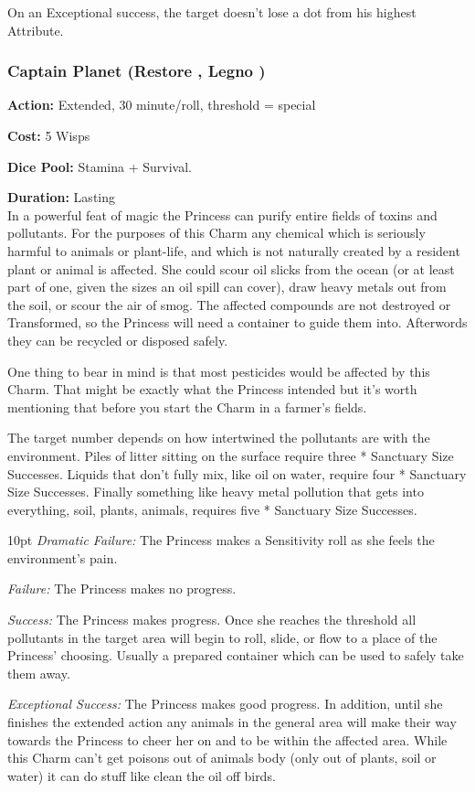On an Exceptional success, the target doesn't lose a dot from his highest Attribute.

\subsubsection*{Captain Planet (Restore \textbullet\textbullet\textbullet\textbullet\textbullet, Legno \textbullet\textbullet\textbullet)}

\noindent \textbf{Action:} Extended, 30 minute/roll, threshold = special

\noindent \textbf{Cost:} 5 Wisps

\noindent \textbf{Dice Pool:} Stamina + Survival.

\noindent \textbf{Duration:} Lasting \\

\noindent In a powerful feat of magic the Princess can purify entire fields of toxins and pollutants. For the purposes of this Charm any chemical which is seriously harmful to animals or plant-life, and which is not naturally created by a resident plant or animal is affected. She could scour oil slicks from the ocean (or at least part of one, given the sizes an oil spill can cover), draw heavy metals out from the soil, or scour the air of smog. The affected compounds are not destroyed or Transformed, so the Princess will need a container to guide them into. Afterwords they can be recycled or disposed safely.

One thing to bear in mind is that most pesticides would be affected by this Charm. That might be exactly what the Princess intended but it's worth mentioning that before you start the Charm in a farmer's fields. 

The target number depends on how intertwined the pollutants are with the environment. Piles of litter sitting on the surface require three * Sanctuary Size Successes. Liquids that don't fully mix, like oil on water, require four * Sanctuary Size Successes. Finally something like heavy metal pollution that gets into everything, soil, plants, animals, requires five * Sanctuary Size Successes. 

\begin{myindentpar}{10pt}    \emph{Dramatic Failure:} The Princess makes a Sensitivity roll as she feels the environment's pain. 

    \emph{Failure:} The Princess makes no progress. 
    
    \emph{Success:} The Princess makes progress. Once she reaches the threshold all pollutants in the target area will begin to roll, slide, or flow to a place of the Princess' choosing. Usually a prepared container which can be used to safely take them away. 
    
    \emph{Exceptional Success:} The Princess makes good progress. In addition, until she finishes the extended action any animals in the general area will make their way towards the Princess to cheer her on and to be within the affected area. While this Charm can't get poisons out of animals body (only out of plants, soil or water) it can do stuff like clean the oil off birds.\end{myindentpar}

